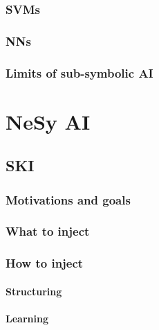 \documentclass[12pt,a4paper,openright,twoside]{book}
\begin{document}
\subsection{\Aclp{SVM}}\label{subsec:svm}

\subsection{\Aclp{NN}}\label{subsec:neural-networks}

\subsection{Limits of sub-symbolic \ac{AI}}\label{subsec:limits-of-sub-symbolic-ai}


\chapter{\Acl{NeSy} \ac{AI}}\label{ch:nesy-ai}

\section{\Acl{SKI}}\label{sec:ski}

\subsection{Motivations and goals}\label{subsec:ski-motivations-and-goals}

\subsection{What to inject}\label{subsec:what-to-inject}

\subsection{How to inject}\label{subsec:how-to-inject}

\subsubsection{Structuring}\label{subsubsec:structuring}

\subsubsection{Learning}\label{subsubsec:learning}
\end{document}
